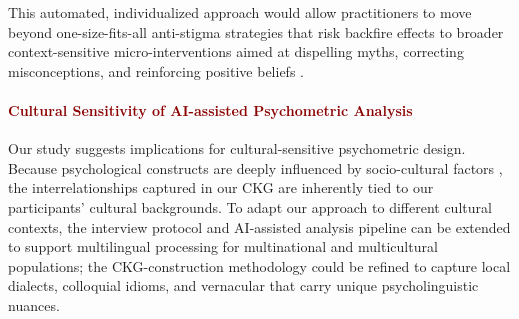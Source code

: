 This automated, individualized approach would allow practitioners to move beyond one-size-fits-all anti-stigma strategies that risk backfire effects \cite{backfire_dobson_2022} to broader context-sensitive micro-interventions aimed at dispelling myths, correcting misconceptions, and reinforcing positive beliefs \cite{realtime_martinez_2024, intervention_corrigan_1999}.








\paragraph{\textcolor{darkred}{\textbf{Cultural Sensitivity of AI-assisted Psychometric Analysis}}}


Our study suggests implications for cultural-sensitive psychometric design. 
Because psychological constructs are deeply influenced by socio-cultural factors \cite{culture_difference_krendl_2020}, the interrelationships captured in our CKG are inherently tied to our participants' cultural backgrounds. 
To adapt our approach to different cultural contexts, the interview protocol and AI-assisted analysis pipeline can be extended to support multilingual processing for multinational and multicultural populations; the CKG-construction methodology could be refined to capture local dialects, colloquial idioms, and vernacular that carry unique psycholinguistic nuances.

